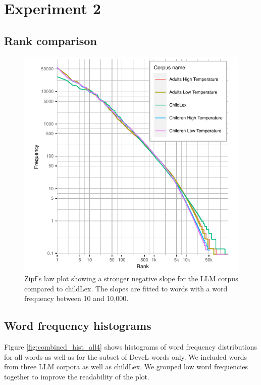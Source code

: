\documentclass[doc, a4paper, anonymous]{apa7}
\begin{document}
\clearpage



\section{Experiment 2}

\subsection{Rank comparison}

\begin{figure}[!htbp]
    \includegraphics[width = .6\paperwidth]{figures/rankf1-exp2.pdf}
    \caption{Zipf's law plot showing a stronger negative slope for the LLM corpus compared to childLex. The slopes are fitted to words with a word frequency between 10 and 10,000. }
    \label{fig:rankplot-normal2}
\end{figure}

\clearpage


\subsection{Word frequency histograms}

Figure \ref{fig:combined_hist_all4} shows histograms of word frequency distributions for all words as well as for the subset of DeveL words only. We included words from three LLM corpora as well as childLex. We grouped low word frequencies together to improve the readability of the plot. 
\end{document}
